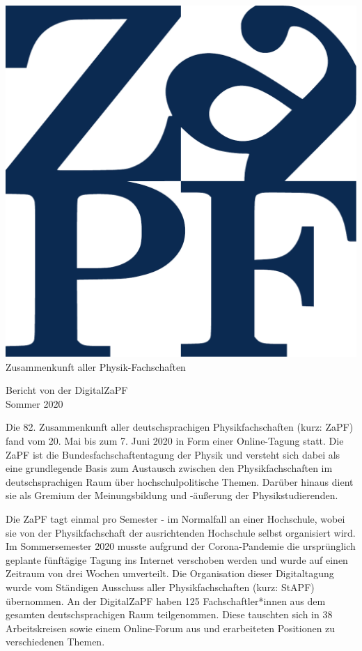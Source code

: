 \documentclass{scrartcl}
\begin{document}
\hspace{0.74\textwidth}
\begin{minipage}{0.25\textwidth}
      \vspace{-1cm}
      \centering
      \includegraphics[width=.89\textwidth]{../logo.pdf}
      \small Zusammenkunft aller Physik-Fachschaften
\end{minipage}

\begin{center}
      \vspace{1.5cm}
      \huge{Bericht von der DigitalZaPF \\ Sommer 2020}
      \vspace{1cm}
\end{center}

Die 82. Zusammenkunft aller deutschsprachigen Physikfachschaften (kurz: ZaPF) fand vom 20. Mai bis zum 7. Juni 2020 in Form einer Online-Tagung statt. Die  ZaPF  ist  die  Bundesfachschaftentagung  der  Physik  und  versteht  sich  dabei  als  eine  grundlegende  Basis  zum  Austausch zwischen den Physikfachschaften im deutschsprachigen Raum über hochschulpolitische Themen. Darüber hinaus dient sie als Gremium der Meinungsbildung und -äußerung der Physikstudierenden.

Die ZaPF tagt einmal pro Semester - im Normalfall an einer Hochschule,  wobei  sie  von  der Physikfachschaft der ausrichtenden Hochschule selbst organisiert wird. Im Sommersemester 2020 musste aufgrund der Corona-Pandemie die ursprünglich geplante fünftägige Tagung ins Internet verschoben werden und wurde auf einen Zeitraum von drei Wochen umverteilt. Die Organisation dieser Digitaltagung wurde vom Ständigen Ausschuss aller Physikfachschaften (kurz: StAPF) übernommen.
An der DigitalZaPF haben 125 Fachschaftler*innen aus dem gesamten deutschsprachigen Raum teilgenommen. Diese tauschten sich in 38 Arbeitskreisen sowie einem Online-Forum aus und erarbeiteten Positionen zu verschiedenen Themen.
\end{document}
